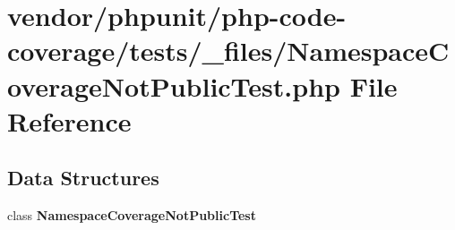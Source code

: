 \section{vendor/phpunit/php-\/code-\/coverage/tests/\+\_\+files/\+Namespace\+Coverage\+Not\+Public\+Test.php File Reference}
\label{php-code-coverage_2tests_2__files_2_namespace_coverage_not_public_test_8php}
\subsection*{Data Structures}
\begin{DoxyCompactItemize}
\item 
class {\bf Namespace\+Coverage\+Not\+Public\+Test}
\end{DoxyCompactItemize}
